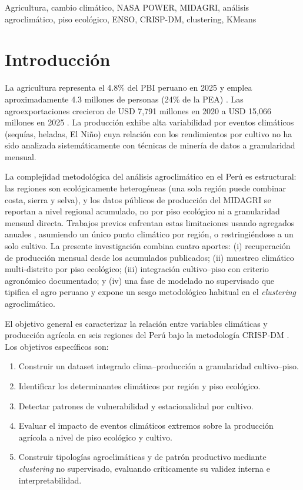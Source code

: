 \documentclass[conference]{IEEEtran}
\begin{document}
\begin{IEEEkeywords}
Agricultura, cambio climático, NASA POWER, MIDAGRI, análisis agroclimático, piso ecológico, ENSO, CRISP-DM, clustering, KMeans
\end{IEEEkeywords}

\section{Introducción}
La agricultura representa el 4.8\% del PBI peruano en 2025 \cite{bcrp2025} y emplea aproximadamente 4.3 millones de personas (24\% de la PEA) \cite{inei2024}. Las agroexportaciones crecieron de USD 7,791 millones en 2020 a USD 15,066 millones en 2025 \cite{adex2026}. La producción exhibe alta variabilidad por eventos climáticos (sequías, heladas, El Niño) cuya relación con los rendimientos por cultivo no ha sido analizada sistemáticamente con técnicas de minería de datos a granularidad mensual.

La complejidad metodológica del análisis agroclimático en el Perú es estructural: las regiones son ecológicamente heterogéneas (una sola región puede combinar costa, sierra y selva), y los datos públicos de producción del MIDAGRI se reportan a nivel regional acumulado, no por piso ecológico ni a granularidad mensual directa. Trabajos previos enfrentan estas limitaciones usando agregados anuales \cite{senamhi2009, unap2016}, asumiendo un único punto climático por región, o restringiéndose a un solo cultivo. La presente investigación combina cuatro aportes: (i) recuperación de producción mensual desde los acumulados publicados; (ii) muestreo climático multi-distrito por piso ecológico; (iii) integración cultivo--piso con criterio agronómico documentado; y (iv) una fase de modelado no supervisado que tipifica el agro peruano y expone un sesgo metodológico habitual en el \textit{clustering} agroclimático.

El objetivo general es caracterizar la relación entre variables climáticas y producción agrícola en seis regiones del Perú bajo la metodología CRISP-DM \cite{inia2019}. Los objetivos específicos son:
\begin{enumerate}
    \item Construir un dataset integrado clima--producción a granularidad cultivo--piso.
    \item Identificar los determinantes climáticos por región y piso ecológico.
    \item Detectar patrones de vulnerabilidad y estacionalidad por cultivo.
    \item Evaluar el impacto de eventos climáticos extremos sobre la producción agrícola a nivel de piso ecológico y cultivo.
    \item Construir tipologías agroclimáticas y de patrón productivo mediante \textit{clustering} no supervisado, evaluando críticamente su validez interna e interpretabilidad.
\end{enumerate}
\end{document}

